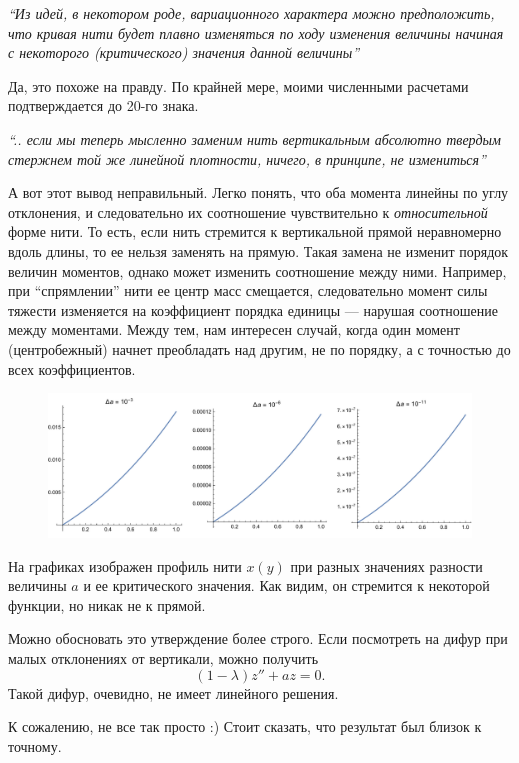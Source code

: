\documentclass[12pt,a4paper]{article}
\begin{document}
\textit{``Из идей, в некотором роде, вариационного характера можно предположить, что кривая нити будет плавно изменяться по ходу изменения величины начиная с некоторого (критического) значения данной величины''}

Да, это похоже на правду. По крайней мере, моими численными расчетами подтверждается до 20-го знака.

\textit{``.. если мы теперь мысленно заменим нить вертикальным абсолютно твердым стержнем той же линейной плотности, ничего, в принципе, не измениться''}

А вот этот вывод неправильный. Легко понять, что оба момента линейны по углу отклонения, и следовательно их соотношение чувствительно к \textit{относительной} форме нити. То есть, если нить стремится к вертикальной прямой неравномерно вдоль длины, то ее нельзя заменять на прямую. Такая замена не изменит порядок величин моментов, однако может изменить соотношение между ними. Например, при ``спрямлении'' нити ее центр масс смещается, следовательно момент силы тяжести изменяется на коэффициент порядка единицы --- нарушая соотношение между моментами. Между тем, нам интересен случай, когда один момент (центробежный) начнет преобладать над другим, не по порядку, а с точностью до всех коэффициентов.

\begin{figure}[!h]
\begin{center}
 \includegraphics[width=\textwidth]{roperesp1.pdf}
\end{center}
\end{figure}

На графиках изображен профиль нити $x(y)$ при разных значениях разности величины $a$ и ее критического значения. Как видим, он стремится к некоторой функции, но никак не к прямой.

Можно обосновать это утверждение более строго. Если посмотреть на дифур при малых отклонениях от вертикали, можно получить
$$
  (1-\lambda)z''+az=0.
$$
Такой дифур, очевидно, не имеет линейного решения.

К сожалению, не все так просто :) Стоит сказать, что результат был близок к точному.
\end{document}
